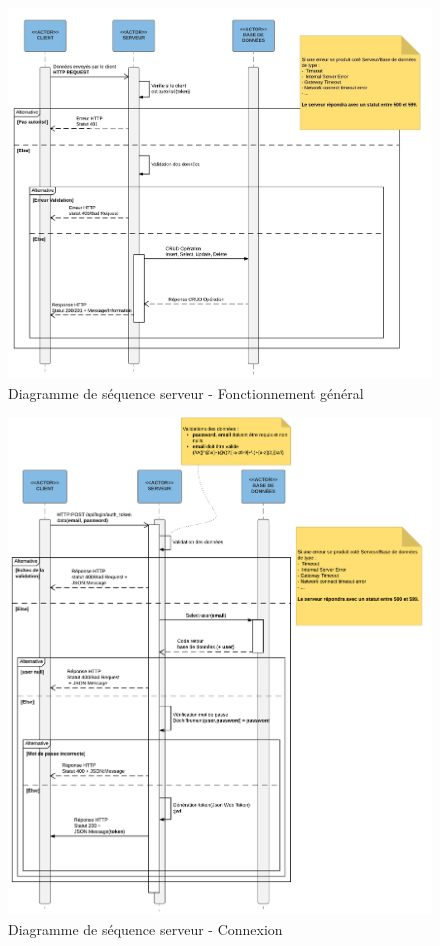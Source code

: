 \documentclass[titlepage]{report}
\begin{document}
\begin{figure}[h]
	\caption{Diagramme de séquence serveur - Fonctionnement général}
	\label{annexe_diagramme_sequence_serveur}
	\centering
	\includegraphics[width=\textwidth]{figures/diagrammes/sequence_serveur.png}
\end{figure}

\begin{figure}[h]
	\caption{Diagramme de séquence serveur - Connexion}
	\label{annexe_diagramme_sequence_serveur_connexion}
	\centering
	\includegraphics[width=\textwidth]{figures/diagrammes/sequence_serveur_connexion.png}
\end{figure}
\end{document}
